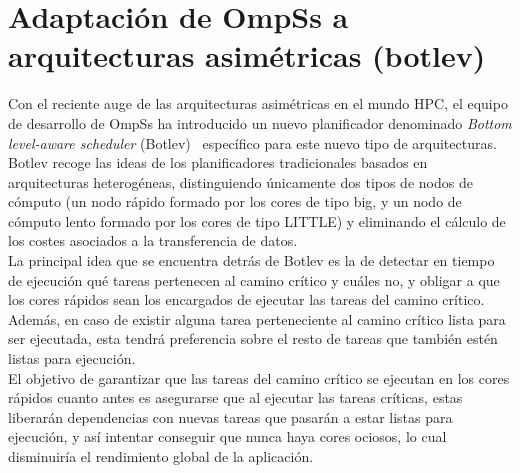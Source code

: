 \section{Adaptación de OmpSs a arquitecturas asimétricas (botlev)}
Con el reciente auge de las arquitecturas asimétricas en el mundo HPC, el
equipo de desarrollo de OmpSs ha introducido un nuevo planificador
denominado \emph{Bottom level-aware scheduler} (Botlev)~\cite{botlev}
específico para este nuevo tipo de arquitecturas. Botlev recoge las ideas
de los planificadores tradicionales basados en arquitecturas heterogéneas,
distinguiendo únicamente dos tipos de nodos de cómputo (un nodo rápido
formado por los cores de tipo big, y un nodo de cómputo lento formado por
los cores de tipo LITTLE) y eliminando el
cálculo de los costes asociados a la transferencia de datos. \\
La principal idea que se encuentra detrás de Botlev es la de detectar en
tiempo de ejecución qué tareas pertenecen al camino crítico y cuáles no, y
obligar a que los cores rápidos sean los encargados de ejecutar las tareas
del camino crítico. Además, en caso de existir alguna tarea perteneciente
al camino crítico lista para ser ejecutada, esta tendrá preferencia sobre
el resto de tareas que también estén listas para ejecución.\\
El objetivo de garantizar que las tareas del camino crítico se ejecutan en
los cores rápidos cuanto antes es asegurarse que al ejecutar las tareas
críticas, estas liberarán dependencias con nuevas tareas que pasarán a
estar listas para ejecución, y así intentar conseguir que nunca haya cores
ociosos, lo cual disminuiría el rendimiento global de la aplicación.

